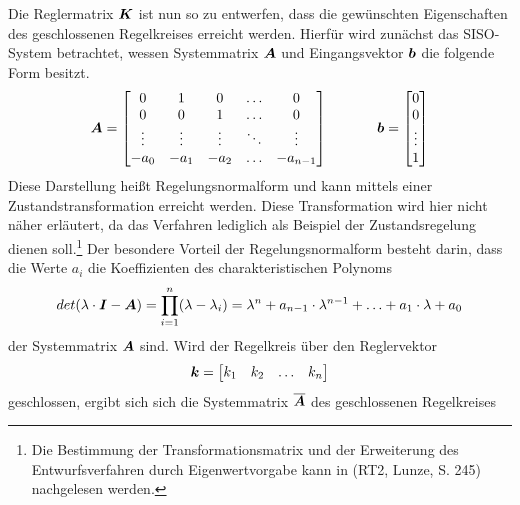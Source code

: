 Die Reglermatrix $\boldsymbol{K}$ ist nun so zu entwerfen, dass die gewünschten Eigenschaften des geschlossenen Regelkreises erreicht werden. Hierfür wird zunächst das SISO-System  betrachtet, wessen Systemmatrix $\boldsymbol{A}$ und Eingangsvektor $\boldsymbol{b}$ die folgende Form besitzt.
\begin{equation}
\boldsymbol{A} = \begin{bmatrix}
0 & 1 & 0 & \hdots & 0 \\
0 & 0 & 1 & \hdots & 0 \\
\vdots & \vdots & \vdots & \ddots & \vdots \\
-a_0 & -a_1 & -a_2 & \hdots & -a_{n-1}
\end{bmatrix}
\hspace{35pt}
\boldsymbol{b} = \begin{bmatrix}
0 \\ 0 \\ \vdots \\ 1
\end{bmatrix}
\end{equation}
Diese Darstellung heißt Regelungsnormalform und kann mittels einer Zustandstransformation erreicht werden. Diese Transformation wird hier nicht näher erläutert, da das Verfahren lediglich als Beispiel der Zustandsregelung dienen soll.\footnote{Die Bestimmung der Transformationsmatrix und der Erweiterung des Entwurfsverfahren durch Eigenwertvorgabe kann in (RT2, Lunze, S. 245) nachgelesen werden.} Der besondere Vorteil der Regelungsnormalform besteht darin, dass die Werte $a_i$ die Koeffizienten des charakteristischen Polynoms 
\begin{equation}
det(\lambda\cdot \boldsymbol{I}-\boldsymbol{A}) = \prod^n_{i=1} (\lambda-\lambda_i) = \lambda^n+a_{n-1}\cdot \lambda^{n-1} + \hdots + a_1\cdot \lambda + a_0
\end{equation}
der Systemmatrix $\boldsymbol{A}$ sind. Wird der Regelkreis über den Reglervektor
\begin{equation}
\boldsymbol{k} = \begin{bmatrix}
k_1 & k_2 & \hdots & k_n
\end{bmatrix}
\end{equation}
geschlossen, ergibt sich sich die  Systemmatrix $\boldsymbol{\overline{A}}$ des geschlossenen Regelkreises
